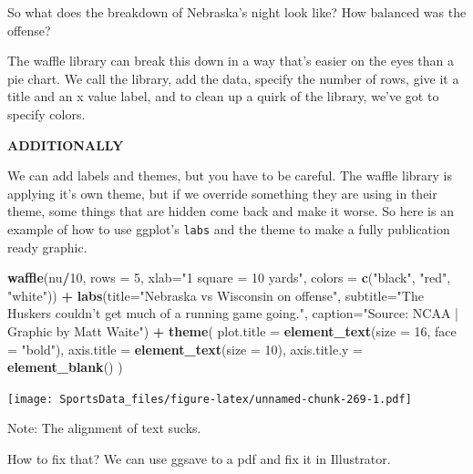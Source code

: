\documentclass[]{book}
\newenvironment{Shaded}{\begin{snugshade}}{\end{snugshade}}
\newcommand{\DataTypeTok}[1]{\textcolor[rgb]{0.13,0.29,0.53}{#1}}
\newcommand{\DecValTok}[1]{\textcolor[rgb]{0.00,0.00,0.81}{#1}}
\newcommand{\KeywordTok}[1]{\textcolor[rgb]{0.13,0.29,0.53}{\textbf{#1}}}
\newcommand{\NormalTok}[1]{#1}
\newcommand{\OperatorTok}[1]{\textcolor[rgb]{0.81,0.36,0.00}{\textbf{#1}}}
\newcommand{\StringTok}[1]{\textcolor[rgb]{0.31,0.60,0.02}{#1}}
\begin{document}
So what does the breakdown of Nebraska's night look like? How balanced was the offense?

The waffle library can break this down in a way that's easier on the eyes than a pie chart. We call the library, add the data, specify the number of rows, give it a title and an x value label, and to clean up a quirk of the library, we've got to specify colors.

\textbf{ADDITIONALLY}

We can add labels and themes, but you have to be careful. The waffle library is applying it's own theme, but if we override something they are using in their theme, some things that are hidden come back and make it worse. So here is an example of how to use ggplot's \texttt{labs} and the theme to make a fully publication ready graphic.

\begin{Shaded}
\begin{Highlighting}[]
\KeywordTok{waffle}\NormalTok{(nu}\OperatorTok{/}\DecValTok{10}\NormalTok{, }\DataTypeTok{rows =} \DecValTok{5}\NormalTok{, }\DataTypeTok{xlab=}\StringTok{"1 square = 10 yards"}\NormalTok{, }\DataTypeTok{colors =} \KeywordTok{c}\NormalTok{(}\StringTok{"black"}\NormalTok{, }\StringTok{"red"}\NormalTok{, }\StringTok{"white"}\NormalTok{)) }\OperatorTok{+}\StringTok{ }\KeywordTok{labs}\NormalTok{(}\DataTypeTok{title=}\StringTok{"Nebraska vs Wisconsin on offense"}\NormalTok{, }\DataTypeTok{subtitle=}\StringTok{"The Huskers couldn't get much of a running game going."}\NormalTok{, }\DataTypeTok{caption=}\StringTok{"Source: NCAA | Graphic by Matt Waite"}\NormalTok{) }\OperatorTok{+}\StringTok{ }
\StringTok{  }\KeywordTok{theme}\NormalTok{(}
    \DataTypeTok{plot.title =} \KeywordTok{element_text}\NormalTok{(}\DataTypeTok{size =} \DecValTok{16}\NormalTok{, }\DataTypeTok{face =} \StringTok{"bold"}\NormalTok{),}
    \DataTypeTok{axis.title =} \KeywordTok{element_text}\NormalTok{(}\DataTypeTok{size =} \DecValTok{10}\NormalTok{),}
    \DataTypeTok{axis.title.y =} \KeywordTok{element_blank}\NormalTok{()}
\NormalTok{  )}
\end{Highlighting}
\end{Shaded}

\texttt{[image: SportsData\_files/figure-latex/unnamed-chunk-269-1.pdf]}

Note: The alignment of text sucks.

How to fix that? We can use ggsave to a pdf and fix it in Illustrator.
\end{document}
